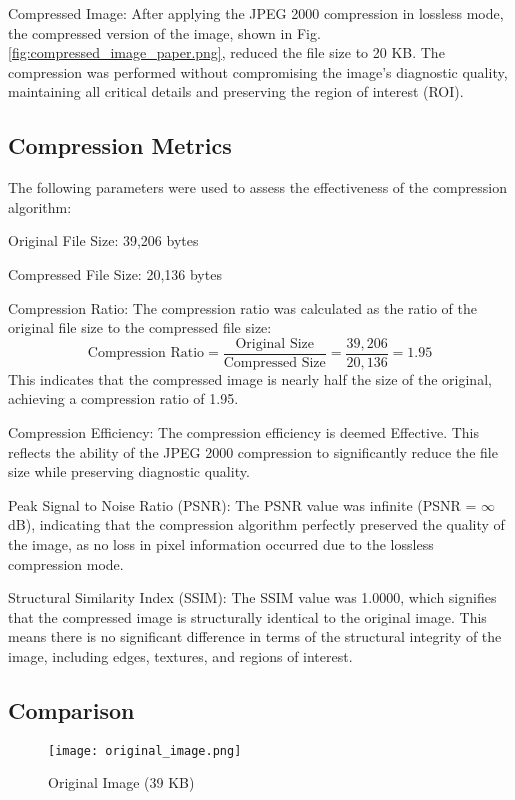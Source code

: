 \documentclass[conference,letterpaper]{IEEEtran}
\begin{document}
Compressed Image: After applying the JPEG 2000 compression in lossless mode, the compressed version of the image, shown in Fig. \ref{fig:compressed_image_paper.png}, reduced the file size to 20 KB. The compression was performed without compromising the image's diagnostic quality, maintaining all critical details and preserving the region of interest (ROI).

\subsection{Compression Metrics}

The following parameters were used to assess the effectiveness of the compression algorithm:

Original File Size: 39,206 bytes
    
Compressed File Size: 20,136 bytes
    
Compression Ratio: The compression ratio was calculated as the ratio of the original file size to the compressed file size:
\[
\text{Compression Ratio} = \frac{\text{Original Size}}{\text{Compressed Size}} = \frac{39,206}{20,136} = 1.95
\]
This indicates that the compressed image is nearly half the size of the original, achieving a compression ratio of 1.95.

Compression Efficiency: The compression efficiency is deemed Effective. This reflects the ability of the JPEG 2000 compression to significantly reduce the file size while preserving diagnostic quality.

Peak Signal to Noise Ratio (PSNR): The PSNR value was infinite (PSNR = $\infty$ dB), indicating that the compression algorithm perfectly preserved the quality of the image, as no loss in pixel information occurred due to the lossless compression mode.

Structural Similarity Index (SSIM): The SSIM value was 1.0000, which signifies that the compressed image is structurally identical to the original image. This means there is no significant difference in terms of the structural integrity of the image, including edges, textures, and regions of interest.

\subsection{Comparison}

\begin{figure}[H]
    \centering
    \texttt{[image: original\_image.png]}
    \caption{Original Image (39 KB)}
    \label{fig:original_image.png}
\end{figure}
\end{document}
